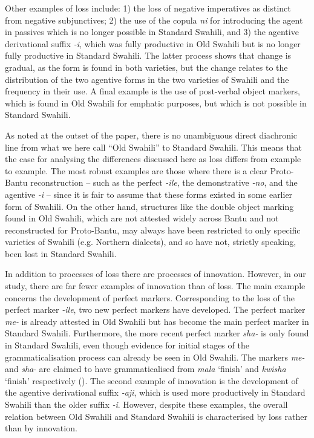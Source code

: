 \documentclass[output=paper]{langscibook}
\begin{document}
Other examples of loss include: 1) the loss of negative imperatives as distinct from negative subjunctives; 2) the use of the copula \textit{ni} for introducing the agent in passives which is no longer possible in Standard Swahili, and 3) the agentive derivational suffix \textit{{}-i}, which was fully productive in Old Swahili but is no longer fully productive in Standard Swahili. The latter process shows that change is gradual, as the form is found in both varieties, but the change relates to the distribution of the two agentive forms in the two varieties of Swahili and the frequency in their use. A final example is the use of post-verbal object markers, which is found in Old Swahili for emphatic purposes, but which is not possible in Standard Swahili. 

As noted at the outset of the paper, there is no unambiguous direct diachronic line from what we here call ``Old Swahili'' to Standard Swahili. This means that the case for analysing the differences discussed here as loss differs from example to example. The most robust examples are those where there is a clear Proto-Bantu reconstruction -- such as the perfect \textit{{}-}\textit{ile}, the demonstrative \textit{{}-no}, and the agentive \textit{{}-i} -- since it is fair to assume that these forms existed in some earlier form of Swahili. On the other hand, structures like the double object marking found in Old Swahili, which are not attested widely across Bantu and not reconstructed for Proto-Bantu, may always have been restricted to only specific varieties of Swahili (e.g. Northern dialects), and so have not, strictly speaking, been lost in Standard Swahili. 

  In addition to processes of loss there are processes of innovation. However, in our study, there are far fewer examples of innovation than of loss. The main example concerns the development of perfect markers. Corresponding to the loss of the perfect marker \textit{{}-ile}, two new perfect markers have developed. The perfect marker \textit{{}me-} is already attested in Old Swahili but has become the main perfect marker in Standard Swahili. Furthermore, the more recent perfect marker \textit{{}sha-} is only found in Standard Swahili, even though evidence for initial stages of the grammaticalisation process can already be seen in Old Swahili. The markers \textit{{}me-} and \textit{{}sha}{}- are claimed to have grammaticalised from \textit{{}mala} ‘finish’ and \textit{{}kwisha} ‘finish’ respectively (\citealt{Schadeberg1990, Muzale1998, Marten1998, Nurse2008}). The second example of innovation is the development of the agentive derivational suffix \textit{{}-aji}, which is used more productively in Standard Swahili than the older suffix \textit{{}-i}. However, despite these examples, the overall relation between Old Swahili and Standard Swahili is characterised by loss rather than by innovation. 
\end{document}
